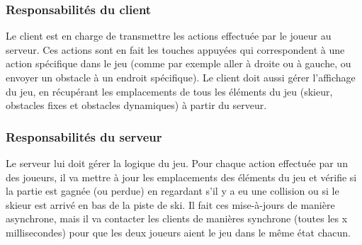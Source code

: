\documentclass[a4paper,12pt]{article}
\begin{document}
	\subsubsection{Responsabilités du client}
	Le client est en charge de transmettre les actions effectuée par le joueur au serveur. Ces actions sont en fait les touches appuyées qui correspondent à  une action spécifique dans le jeu (comme par exemple aller à droite ou à gauche, ou envoyer un obstacle à un endroit spécifique). Le client doit aussi gérer l'affichage du jeu, en récupérant les emplacements de tous les éléments du jeu (skieur, obstacles fixes et obstacles dynamiques) à partir du serveur.
	
	\subsubsection{Responsabilités du serveur}
	Le serveur lui doit gérer la logique du jeu. Pour chaque action effectuée par un des joueurs, il va mettre à jour les emplacements des éléments du jeu et vérifie si la partie est gagnée (ou perdue) en regardant s'il y a eu une collision ou si le skieur est arrivé en bas de la piste de ski. Il fait ces mise-à-jours de manière asynchrone, mais il va contacter les clients de manières synchrone (toutes les x millisecondes) pour que les deux joueurs aient le jeu dans le même état chacun.
\end{document}
